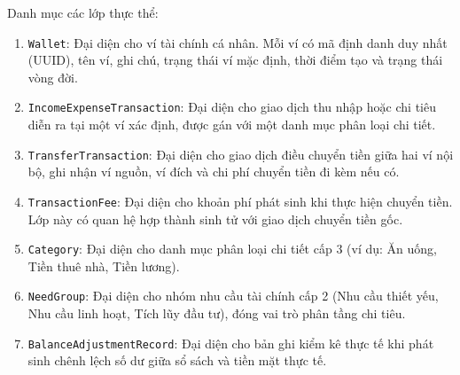 \documentclass[a4paper,12pt]{report}
\providecommand{\tightlist}{%
  \setlength{\itemsep}{0pt}\setlength{\parskip}{0pt}}
\newcommand{\passthrough}[1]{#1}
\begin{document}
Danh mục các lớp thực thể:
\begin{enumerate}
\def\labelenumi{\arabic{enumi}.}
\tightlist
\item
  \passthrough{\lstinline!Wallet!}: Đại diện cho ví tài chính cá nhân. Mỗi
  ví có mã định danh duy nhất (UUID), tên ví, ghi chú, trạng thái ví mặc
  định, thời điểm tạo và trạng thái vòng đời.
\item
  \passthrough{\lstinline!IncomeExpenseTransaction!}: Đại diện cho giao dịch
  thu nhập hoặc chi tiêu diễn ra tại một ví xác định, được gán với một
  danh mục phân loại chi tiết.
\item
  \passthrough{\lstinline!TransferTransaction!}: Đại diện cho giao dịch điều
  chuyển tiền giữa hai ví nội bộ, ghi nhận ví nguồn, ví đích và chi phí
  chuyển tiền đi kèm nếu có.
\item
  \passthrough{\lstinline!TransactionFee!}: Đại diện cho khoản phí phát
  sinh khi thực hiện chuyển tiền. Lớp này có quan hệ hợp thành sinh tử với
  giao dịch chuyển tiền gốc.
\item
  \passthrough{\lstinline!Category!}: Đại diện cho danh mục phân loại chi
  tiết cấp 3 (ví dụ: Ăn uống, Tiền thuê nhà, Tiền lương).
\item
  \passthrough{\lstinline!NeedGroup!}: Đại diện cho nhóm nhu cầu tài chính
  cấp 2 (Nhu cầu thiết yếu, Nhu cầu linh hoạt, Tích lũy đầu tư), đóng vai
  trò phân tầng chi tiêu.
\item
  \passthrough{\lstinline!BalanceAdjustmentRecord!}: Đại diện cho bản ghi
  kiểm kê thực tế khi phát sinh chênh lệch số dư giữa sổ sách và tiền mặt
  thực tế.
\end{enumerate}
\end{document}
